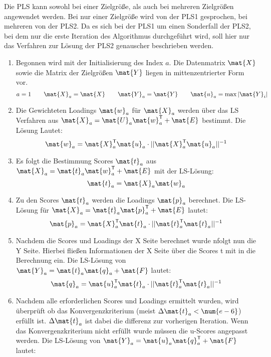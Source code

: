 Die \gls{PLS} kann sowohl bei einer Zielgröße, als auch bei mehreren Zielgrößen angewendet werden.
Bei nur einer Zielgröße wird von der \gls{PLS}1 gesprochen, bei mehreren von der \gls{PLS}2.
Da es sich bei der \gls{PLS}1 um einen Sonderfall der \gls{PLS}2, bei dem nur die erste Iteration des Algorithmus durchgeführt wird, soll hier nur das Verfahren zur Lösung der \gls{PLS}2 genauscher beschrieben werden.
\begin{enumerate}
    \item Begonnen wird mit der Initialisierung des Index $a$.
        Die Datenmatrix $\mat{X}$ sowie die Matrix der Zielgrößen $\mat{Y}$ liegen in mittenzentrierter Form vor.
        $$a = 1 \qquad \mat{X}_a = \mat{X} \qquad \mat{Y}_a = \mat{Y} \qquad \mat{u}_a = \operatorname{max}|\mat{Y}_i|$$
    \item Die Gewichteten Loadings $\mat{w}_a$ für $\mat{X}_a$ werden über das \gls{LS} Verfahren aus $\mat{X}_a = \mat{U}_a \mat{w}_a^\mathsf{T} + \mat{E}$ bestimmt.
        Die Lösung Lautet:
        $$\mat{w}_a = \mat{X}_a^\mathsf{T} \mat{u}_a \cdot ||\mat{X}_a^\mathsf{T} \mat{u}_a||^{-1}$$
    \item Es folgt die Bestimmung Scores $\mat{t}_a$ aus $\mat{X}_a = \mat{t}_a \mat{w}_a^\mathsf{T} + \mat{E}$ mit der \gls{LS}-Lösung:
        $$\mat{t}_a = \mat{X}_a \mat{w}_a$$
    \item Zu den Scores $\mat{t}_a$ werden die Loadings $\mat{p}_a$ berechnet. Die \gls{LS}-Lösung für $\mat{X}_a = \mat{t}_a \mat{p}_a^\mathsf{T} + \mat{E}$ lautet:
        $$\mat{p}_a = \mat{X}_a^\mathsf{T} \mat{t}_a \cdot ||\mat{t}_a^\mathsf{T} \mat{t}_a||^{-1}$$
    \item Nachdem die Scores und Loadings der X Seite berechnet wurde nfolgt nun die Y Seite.
        Hierbei fließen Informationen der X Seite über die Scores t mit in die Berechnung ein.
        Die \gls{LS}-Lösung von $\mat{Y}_a = \mat{t}_a \mat{q}_a + \mat{F}$ lautet:
        $$\mat{q}_a = \mat{u}_a^\mathsf{T} \mat{t}_a \cdot ||\mat{t}_a^\mathsf{T} \mat{t}_a||^{-1}$$
    \item Nachdem alle erforderlichen Scores und Loadings ermittelt wurden, wird überprüft ob das Konvergenzkriterium (meist $\Delta \mat{t}_a < \num{e-6}$) erfüllt ist.
        $\Delta \mat{t}_a$ ist dabei die differenz zur vorherigen Iteration.
        Wenn das Konvergenzkriterium nicht erfüllt wurde müssen die u-Scores angepasst werden.
        Die \gls{LS}-Lösung von $\mat{Y}_a = \mat{u}_a \mat{q}_a^\mathsf{T} + \mat{F}$ lautet: 

\end{enumerate}

